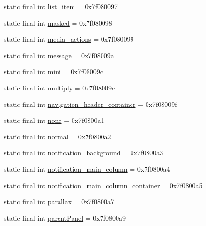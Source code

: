 \begin{DoxyCompactItemize}
\item 
static final int \mbox{\hyperlink{classandroid_1_1support_1_1design_1_1_r_1_1id_aeeec2bcf1f8afaf2c5f7a49c7563a3a0}{list\+\_\+item}} = 0x7f080097
\item 
static final int \mbox{\hyperlink{classandroid_1_1support_1_1design_1_1_r_1_1id_afc81163bf733b0dbd07b3b42bbd7c787}{masked}} = 0x7f080098
\item 
static final int \mbox{\hyperlink{classandroid_1_1support_1_1design_1_1_r_1_1id_aed56f430ded713604804f6ef2e52001f}{media\+\_\+actions}} = 0x7f080099
\item 
static final int \mbox{\hyperlink{classandroid_1_1support_1_1design_1_1_r_1_1id_ab58c404e690499850326c54532b67d90}{message}} = 0x7f08009a
\item 
static final int \mbox{\hyperlink{classandroid_1_1support_1_1design_1_1_r_1_1id_a88811cbf51e1d607ab0468ba99937bd6}{mini}} = 0x7f08009c
\item 
static final int \mbox{\hyperlink{classandroid_1_1support_1_1design_1_1_r_1_1id_a134f5f17353ed21214390ab7ea4dff8b}{multiply}} = 0x7f08009e
\item 
static final int \mbox{\hyperlink{classandroid_1_1support_1_1design_1_1_r_1_1id_a4ba0611713d8d7328f336a8220b88f33}{navigation\+\_\+header\+\_\+container}} = 0x7f08009f
\item 
static final int \mbox{\hyperlink{classandroid_1_1support_1_1design_1_1_r_1_1id_a9408d8d9326a8268cca9848a4f0c4264}{none}} = 0x7f0800a1
\item 
static final int \mbox{\hyperlink{classandroid_1_1support_1_1design_1_1_r_1_1id_a075ec293abae4b6570743febf3eb6b3e}{normal}} = 0x7f0800a2
\item 
static final int \mbox{\hyperlink{classandroid_1_1support_1_1design_1_1_r_1_1id_aac8da5dddb77215b07e2bc84bd1b22d2}{notification\+\_\+background}} = 0x7f0800a3
\item 
static final int \mbox{\hyperlink{classandroid_1_1support_1_1design_1_1_r_1_1id_a7c01e843bd2f6524e2c4d59abda44b3f}{notification\+\_\+main\+\_\+column}} = 0x7f0800a4
\item 
static final int \mbox{\hyperlink{classandroid_1_1support_1_1design_1_1_r_1_1id_aeb6b68e9fe2941575be7ed8a5e43b858}{notification\+\_\+main\+\_\+column\+\_\+container}} = 0x7f0800a5
\item 
static final int \mbox{\hyperlink{classandroid_1_1support_1_1design_1_1_r_1_1id_a9188f01eb52456eb2965c39dc691e444}{parallax}} = 0x7f0800a7
\item 
static final int \mbox{\hyperlink{classandroid_1_1support_1_1design_1_1_r_1_1id_a298108f25bd760f5b125688096d0de14}{parent\+Panel}} = 0x7f0800a9

\end{DoxyCompactItemize}
